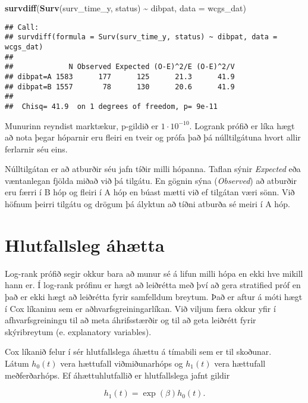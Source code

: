 \documentclass[
]{book}
\newenvironment{Shaded}{\begin{snugshade}}{\end{snugshade}}
\newcommand{\DataTypeTok}[1]{\textcolor[rgb]{0.13,0.29,0.53}{#1}}
\newcommand{\KeywordTok}[1]{\textcolor[rgb]{0.13,0.29,0.53}{\textbf{#1}}}
\newcommand{\NormalTok}[1]{#1}
\newcommand{\OperatorTok}[1]{\textcolor[rgb]{0.81,0.36,0.00}{\textbf{#1}}}
\newcommand{\StringTok}[1]{\textcolor[rgb]{0.31,0.60,0.02}{#1}}
\begin{document}
\begin{Shaded}
\begin{Highlighting}[]
\KeywordTok{survdiff}\NormalTok{(}\KeywordTok{Surv}\NormalTok{(surv\_time\_y, status) }\OperatorTok{\textasciitilde{}}\StringTok{ }\NormalTok{dibpat, }\DataTypeTok{data =}\NormalTok{ wcgs\_dat)}
\end{Highlighting}
\end{Shaded}

\begin{verbatim}
## Call:
## survdiff(formula = Surv(surv_time_y, status) ~ dibpat, data = wcgs_dat)
## 
##             N Observed Expected (O-E)^2/E (O-E)^2/V
## dibpat=A 1583      177      125      21.3      41.9
## dibpat=B 1557       78      130      20.6      41.9
## 
##  Chisq= 41.9  on 1 degrees of freedom, p= 9e-11
\end{verbatim}

Munurinn reyndist marktækur, p-gildið er \(1 \cdot 10^{-10}\). Logrank prófið er líka hægt að nota þegar hóparnir eru fleiri en tveir og prófa það þá núlltilgátuna hvort allir ferlarnir séu eins.

Núlltilgátan er að atburðir séu jafn tíðir milli hópanna. Taflan sýnir \emph{Expected} eða væntanlegan fjölda miðað við þá tilgátu. En gögnin sýna (\emph{Observed}) að atburðir eru færri í B hóp og fleiri í A hóp en búast mætti við ef tilgátan væri sönn. Við höfnum þeirri tilgátu og drögum þá ályktun að tíðni atburða sé meiri í A hóp.

\hypertarget{prof_haz}{%
\section{Hlutfallsleg áhætta}\label{prof_haz}}

Log-rank prófið segir okkur bara að munur sé á lifun milli hópa en ekki hve mikill hann er. Í log-rank prófinu er hægt að leiðrétta með því að gera stratified próf en það er ekki hægt að leiðrétta fyrir samfelldum breytum. Það er aftur á móti hægt í Cox líkaninu sem er aðhvarfsgreiningarlíkan. Við viljum færa okkur yfir í afhvarfsgreiningu til að meta áhrifsstærðir og til að geta leiðrétt fyrir skýribreytum (e. explanatory variables).

Cox líkanið felur í sér hlutfallslega áhættu á tímabili sem er til skoðunar.\\
Látum \(h_0(t)\) vera hættufall viðmiðunarhóps og \(h_1(t)\) vera hættufall meðferðarhóps. Ef áhættuhlutfallið er hlutfallslega jafnt gildir

\[
h_1(t) = \exp(\beta)h_0(t).
\]
\end{document}
